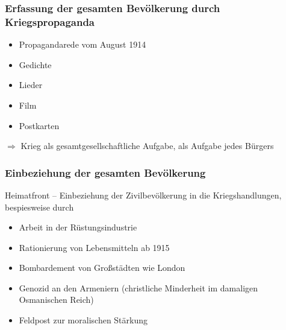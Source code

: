 \subsubsection{Erfassung der gesamten Bevölkerung durch
Kriegspropaganda}

\begin{itemize}
\item Propagandarede   vom August 1914
\item Gedichte
\item Lieder
\item Film
\item Postkarten
\end{itemize}

$\Longrightarrow$ Krieg als gesamtgesellschaftliche Aufgabe, als
Aufgabe jedes Bürgers


\subsubsection{Einbeziehung der gesamten Bevölkerung}

Heimatfront -- Einbeziehung der Zivilbevölkerung in die
Kriegshandlungen, bespiesweise durch

\begin{itemize}
\item Arbeit in der Rüstungsindustrie
\item Rationierung von Lebensmitteln ab 1915
\item Bombardement von Großstädten wie London
\item Genozid an den Armeniern (christliche Minderheit im damaligen
Osmanischen Reich)
\item Feldpost zur moralischen Stärkung
\end{itemize}
